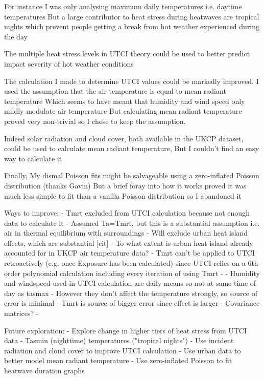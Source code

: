 \documentclass[10pt,letterpaper]{article}
\begin{document}
For instance I was only analysing maximum daily temperatures i.e. daytime temperatures
But a large contributor to heat stress during heatwaves are tropical nights which prevent people getting a break from hot weather experienced during the day

The multiple heat stress levels in UTCI theory could be used to better predict impact severity of hot weather conditions

The calculation I made to determine UTCI values could be markedly improved.
I used the assumption that the air temperature is equal to mean radiant temperature 
Which seems to have meant that humidity and wind speed only mildly modulate air temperature
But calculating mean radiant temperature proved very non-trivial so I chose to keep the assumption.

Indeed solar radiation and cloud cover, both available in the UKCP dataset, could be used to calculate mean radiant temperature,
But I couldn’t find an easy way to calculate it

Finally,
My dismal Poisson fits might be salvageable using a zero-inflated Poisson distribution (thanks Gavin)
But a brief foray into how it works proved it was much less simple to fit than a vanilla Poisson distribution so I abandoned it



Ways to improve:
- Tmrt excluded from UTCI calculation because not enough data to calculate it
    - Assumed Ta=Tmrt, but this is a substantial assumption i.e. air in thermal equilibrium with surroundings
    - Will exclude urban heat island effects, which are substantial [cit]
    - To what extent is urban heat island already accounted for in UKCP air temperature data?
    - Tmrt can't be applied to UTCI retroactively (e.g. once Exposure has been calculated) since UTCI relies on a 6th order polynomial calculation including every iteration of using Tmrt
    - \cite{Weihs2018}
- Humidity and windspeed used in UTCI calculation are daily means so not at same time of day as tasmax
    - However they don't affect the temperature strongly, so source of error is minimal
    - Tmrt is source of bigger error since effect is larger
    - Covariance matrices?
- 

Future exploration:
- Explore change in higher tiers of heat stress from UTCI data
- Tasmin (nighttime) temperatures ("tropical nights")
- Use incident radiation and cloud cover to improve UTCI calculation
- Use urban data to better model mean radiant temperature
- Use zero-inflated Poisson to fit heatwave duration graphs
\end{document}
